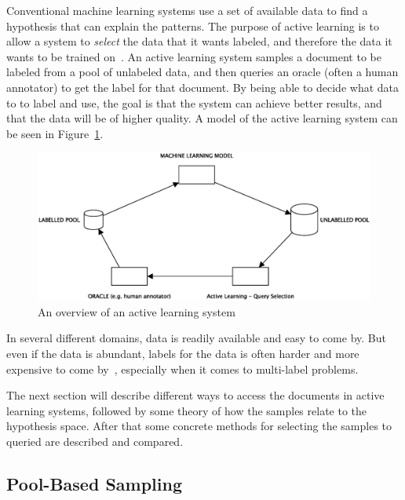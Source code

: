 Conventional machine learning systems use a set of available data to find a hypothesis that can explain the patterns.
The purpose of active learning is to allow a system to \textit{select} the data that it wants labeled, and therefore the data it wants to be trained on~\cite{settles2012active}.
An active learning system samples a document to be labeled from a pool of unlabeled data, and then queries an oracle (often a human annotator) to get the label for that document.
By being able to decide what data to to label and use, the goal is that the system can achieve better results, and that the data will be of higher quality.
A model of the active learning system can be seen in Figure~\ref{fig:active-learning-model}.
\begin{figure}[!ht]
    \centering
    \includegraphics[scale=0.5]{figures/active-learning-model.eps}
    \caption{An overview of an active learning system}
    \label{fig:active-learning-model}
\end{figure}

In several different domains, data is readily available and easy to come by.
But even if the data is abundant, labels for the data is often harder and more expensive to come by~\cite{settles2012active}, especially when it comes to multi-label problems.

The next section will describe different ways to access the documents in active learning systems, followed by some theory of how the samples relate to the hypothesis space.
After that some concrete methods for selecting the samples to queried are described and compared.

\subsection{Pool-Based Sampling}

